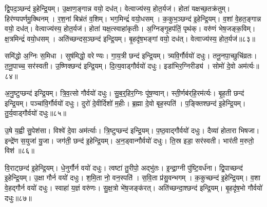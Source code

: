 द्वि॒पद॒ञ्छन्द॑ इ॒हेन्द्रि॒यम्। उ॒क्षाण॒ङ्गान्न वयो॒ दध॑त्। वेत्वाज्य॑स्य॒ होत॒र्यज॑। होता॑ यक्षच्छ॒तक्र॑तुम्। हिर॑ण्यपर्णमु॒क्थिनम्। र॒श॒नां बिभ्र॑तं व॒शिम्। भग॒मिन्द्रं॑ वयो॒धसम्। क॒कुभ॒ञ्छन्द॑ इ॒हेन्द्रि॒यम्। व॒शां वे॒हत॒ङ्गान्न वयो॒ दध॑त्। वेत्वाज्य॑स्य॒ होत॒र्यज॑। होता॑ यक्ष॒त्स्वाहा॑कृतीः। अ॒ग्निङ्गृ॒हप॑तिं॒ पृथ॑क्। वरु॑णं भेष॒जङ्क॒विम्। क्ष॒त्रमिन्द्रं॑ वयो॒धसम्। अति॑च्छन्दस॒ञ्छन्द॑ इन्द्रि॒यम्। बृ॒हदृ॑ष॒भङ्गां वयो॒ दध॑त्। वेत्वाज्य॑स्य॒ होत॒र्यज॑॥८३॥

समि॑द्धो अ॒ग्निः स॒मिधा। सुष॑मिद्धो॒ वरेण्यः। गा॒य॒त्री छन्द॑ इन्द्रि॒यम्। त्र्यवि॒र्गौर्वयो॑ दधुः। तनू॒नपा॒च्छुचि॑व्रतः। त॒नू॒पाच्च॒ सर॑स्वती। उ॒ष्णिक्छन्द॑ इन्द्रि॒यम्। दि॒त्य॒वाड्गौर्वयो॑ दधुः। इडा॑भिर॒ग्निरीड्य॑। सोमो॑ दे॒वो अम॑र्त्यः॥८४॥

अ॒नु॒ष्टुप्छन्द॑ इन्द्रि॒यम्। त्रि॒व॒त्सो गौर्वयो॑ दधुः। सु॒ब॒र्॒हिर॒ग्निः पू॑ष॒ण्वान्। स्ती॒र्णब॑र्‌हि॒रम॑र्त्यः। बृ॒ह॒ती छन्द॑ इन्द्रि॒यम्। पञ्चा॑वि॒र्गौर्वयो॑ दधुः। दुरो॑ दे॒वीर्दिशो॑ म॒हीः। ब्र॒ह्मा दे॒वो बृह॒स्पति॑। प॒ङ्क्तिश्छन्द॑ इ॒हेन्द्रि॒यम्। तु॒र्य॒वाड्गौर्वयो॑ दधुः॥८५॥

उ॒षे य॒ह्वी सु॒पेश॑सा। विश्वे॑ दे॒वा अम॑र्त्याः। त्रि॒ष्टुप्छन्द॑ इन्द्रि॒यम्। प॒ष्ठ॒वाद्गौर्वयो॑ दधुः। दैव्या॑ होतारा भिषजा। इन्द्रे॑ण स॒युजा॑ यु॒जा। जग॑ती॒ छन्द॑ इ॒हेन्द्रि॒यम्। अ॒न॒ड्वान्गौर्वयो॑ दधुः। ति॒स्र इडा॒ सर॑स्वती। भार॑ती म॒रुतो॒ विश॑॥८६॥

वि॒राट्छन्द॑ इ॒हेन्द्रि॒यम्। धे॒नुर्गौर्न वयो॑ दधुः। त्वष्टा॑ तु॒रीपो॒ अद्भु॑तः। इ॒न्द्रा॒ग्नी पु॑ष्टि॒वर्ध॑ना। द्वि॒पाच्छन्द॑ इ॒हेन्द्रि॒यम्। उ॒क्षा गौर्न वयो॑ दधुः। श॒मि॒ता नो॒ वन॒स्पति॑। स॒वि॒ता प्र॑सु॒वन्भगम्। क॒कुच्छन्द॑ इ॒हेन्द्रि॒यम्। व॒शा वे॒हद्गौर्न वयो॑ दधुः। स्वाहा॑ य॒ज्ञं वरु॑णः। सु॒क्ष॒त्रो भे॑ष॒जङ्क॑रत्। अति॑च्छन्दा॒श्छन्द॑ इन्द्रि॒यम्। बृ॒हदृ॑ष॒भो गौर्वयो॑ दधुः॥८७॥\anuvakamend[अम॑र्त्यस्तुर्य॒वाड्गौर्वयो॑ दधु॒र्विशो॑ व॒शा वे॒हद्गौर्न वयो॑ दधुश्च॒त्वारि॑ च]

